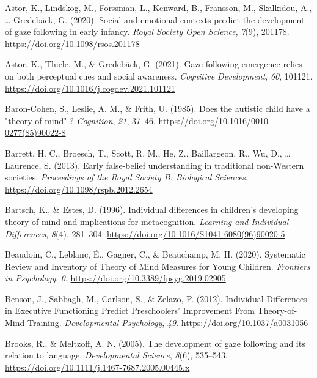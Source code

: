 \documentclass[
  man,floatsintext]{apa6}
\newlength{\cslhangindent}
\newlength{\cslentryspacingunit} %
\newenvironment{CSLReferences}[2] %
 {%
  \setlength{\parindent}{0pt}
  \ifodd #1
  \let\oldpar\par
  \def\par{\hangindent=\cslhangindent\oldpar}
  \fi
  \setlength{\parskip}{#2\cslentryspacingunit}
 }%
 {}
\begin{document}
\hypertarget{refs}{}
\begin{CSLReferences}{1}{0}
\leavevmode{}%
Astor, K., Lindskog, M., Forssman, L., Kenward, B., Fransson, M., Skalkidou, A., \ldots{} Gredebäck, G. (2020). Social and emotional contexts predict the development of gaze following in early infancy. \emph{Royal Society Open Science}, \emph{7}(9), 201178. \url{https://doi.org/10.1098/rsos.201178}

\leavevmode{}%
Astor, K., Thiele, M., \& Gredebäck, G. (2021). Gaze following emergence relies on both perceptual cues and social awareness. \emph{Cognitive Development}, \emph{60}, 101121. \url{https://doi.org/10.1016/j.cogdev.2021.101121}

\leavevmode{}%
Baron-Cohen, S., Leslie, A. M., \& Frith, U. (1985). Does the autistic child have a "theory of mind" ? \emph{Cognition}, \emph{21}, 37--46. \url{https://doi.org/10.1016/0010-0277(85)90022-8}

\leavevmode{}%
Barrett, H. C., Broesch, T., Scott, R. M., He, Z., Baillargeon, R., Wu, D., \ldots{} Laurence, S. (2013). Early false-belief understanding in traditional non-{Western} societies. \emph{Proceedings of the Royal Society B: Biological Sciences}. \url{https://doi.org/10.1098/rspb.2012.2654}

\leavevmode{}%
Bartsch, K., \& Estes, D. (1996). Individual differences in children's developing theory of mind and implications for metacognition. \emph{Learning and Individual Differences}, \emph{8}(4), 281--304. \url{https://doi.org/10.1016/S1041-6080(96)90020-5}

\leavevmode{}%
Beaudoin, C., Leblanc, É., Gagner, C., \& Beauchamp, M. H. (2020). Systematic {Review} and {Inventory} of {Theory} of {Mind Measures} for {Young Children}. \emph{Frontiers in Psychology}, \emph{0}. \url{https://doi.org/10.3389/fpsyg.2019.02905}

\leavevmode{}%
Benson, J., Sabbagh, M., Carlson, S., \& Zelazo, P. (2012). Individual {Differences} in {Executive Functioning Predict Preschoolers}' {Improvement From Theory-of-Mind Training}. \emph{Developmental Psychology}, \emph{49}. \url{https://doi.org/10.1037/a0031056}

\leavevmode{}%
Brooks, R., \& Meltzoff, A. N. (2005). The development of gaze following and its relation to language. \emph{Developmental Science}, \emph{8}(6), 535--543. \url{https://doi.org/10.1111/j.1467-7687.2005.00445.x}


\end{CSLReferences}
\end{document}

